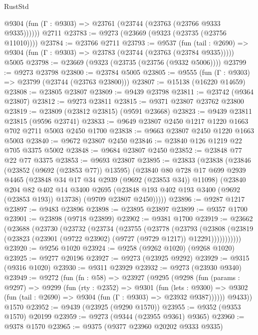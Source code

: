 \begin{lexlean}{RustStd}
\begin{coremodule}
{\begin{coremodule}
{{{{{{{{{{{{{{{{{{{{{{{{{{{{{{{{{{{{{{{{{{{{{{{{{{{{{{{      @9304 (fun (Γ : @9303) => @23761 (@23744 (@23763 (@23766 @9333 @9335))))))
    @2711
@23783 := @9273 (@23669 (@9323 (@23735 (@23756 @11010))))
@23784 := @23766 @2711
@23793 := @9537
    (fun (tail : @2690) => @9304 (fun (Γ : @9303) => @23783 (@23744 (@23763 (@23784 @9335)))))
    @5005
@23798 := @23669 (@9323 (@23735 (@23756 (@9332 @5006))))
@23799 := @9273 @23798
@23800 := @23784 @5005
@23805 := @9555 (fun (Γ : @9303) => @23799 (@23744 (@23763 @23800)))
@23807 := @15138 (@16220 @14659)
@23808 := @23805 @23807
@23809 := @9439 @23798
@23811 := @23742 (@9364 @23807)
@23812 := @9273 @23811
@23815 := @9371 @23807 @23762 @23800
@23819 := @23809 (@23812 @23815) (@9591 @23668)
@23823 := @9439 @23811 @23815 (@9596 @23741)
@23833 := @9649 @23807 @2450 @1217 @1220 @1663 @702 @2711 @5003 @2450 @1700
@23838 := @9663 @23807 @2450 @1220 @1663 @5003
@23840 := @9672 @23807 @2450
@23846 := @23840 @126 @1219 @22 @705 @3375 @5002
@23848 := @9684 @23807 @2450
@23852 := @23848 @77 @22 @77 @3375
@23853 := @9693 @23807
@23895 := @23833
    (@23838
      (@23846
        (@23852 (@9692 (@23853 @77)) @13595)
        (@23840
          @80
          @728
          @17
          @699
          @2939
          @4465
          (@23848 @34 @17 @34 @2939 (@9692 (@23853 @34)) @11098)
          (@23840
            @204
            @82
            @402
            @14
            @3400
            @2695
            (@23848 @193 @402 @193 @3400 (@9692 (@23853 @193)) @13738)
            (@9709 @23807 @2450)))))
@23896 := @9287 @1217
@23897 := @9483 @23896
@23898 := @23895 @23897
@23899 := @9357 @1700
@23901 := @23898 (@9718 @23899)
@23902 := @9381 @1700
@23919 := @23662
    (@23688
      (@23730
        (@23732
          (@23734
            (@23755
              (@23778
                (@23793
                  (@23808
                    (@23819 (@23823 (@23901 (@9722 @23902) (@9727 (@9729 @1217)) @12291)))))))))))
@23920 := @9256 @1020
@23924 := @9258 (@9262 @1020) (@9268 @1020)
@23925 := @9277 @20196
@23927 := @9273 (@23925 @9292)
@23929 := @9315 (@9316 @1020)
@23930 := @9311 @23929
@23932 := @9273 (@23930 @9340)
@23949 := @9272
    (fun (fn : @58) =>
    @23927
      (@9295
        (@9298
          (fun (params : @9297) =>
          @9299
            (fun (rty : @2352) =>
            @9301
              (fun (lets : @9300) =>
              @9302 (fun (tail : @2690) => @9304 (fun (Γ : @9303) => @23932 @9387))))))
        @9433))
    @1570
@23952 := @9439 (@23925 (@9290 @1570))
@23955 := @9352 (@9353 @1570) @20199
@23959 := @9273 (@9344 (@23955 @9361) @9365)
@23960 := @9378 @1570
@23965 := @9375 (@9377 @23960 @20202 @9333 @9335)
}}}}}}}}}}}}}}}}}}}}}}}}}}}}}}}}}}}}}}}}}}}}}}}}}}}}}}}
\end{coremodule}}
\end{coremodule}
\end{lexlean}
